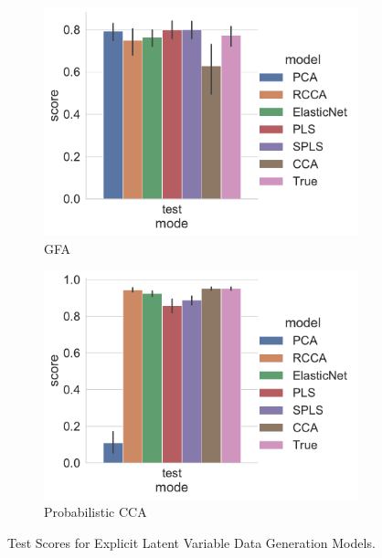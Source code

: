\begin{figure}
\centering
\begin{subfigure}{0.49\linewidth}
\centering
\includegraphics[width=\linewidth]{figures/simulated/low/Train_Test_Scores_Identity_Covariance_explicit}
\caption{GFA}
\end{subfigure}
%
\begin{subfigure}{0.49\linewidth}
\centering
\includegraphics[width=\linewidth]{figures/simulated/low/Train_Test_Scores_Random_Covariance_explicit}
\caption{Probabilistic CCA}
\end{subfigure}
\caption{Test Scores for Explicit Latent Variable Data Generation Models.}\label{fig:latent-variable-scores}
\end{figure}

